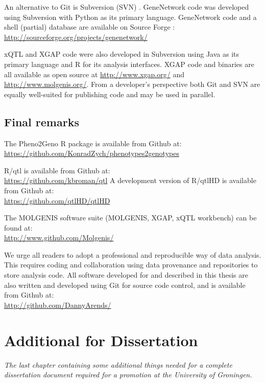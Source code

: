 An alternative to Git is Subversion (SVN) \cite{SVN:2002}. GeneNetwork code was developed 
using Subversion with Python as its primary language. GeneNetwork code and a shell (partial) 
database are available on Source Forge \cite{GeneNetwork:1994, GeneNetwork:2004}:\\
\url{http://sourceforge.org/projects/genenetwork/}

xQTL and XGAP code were also developed in Subversion \cite{SVN:2002} using Java as its primary language and 
R for its analysis interfaces. XGAP code and binaries are all available as open source at
\url{http://www.xgap.org/} and \url{http://www.molgenis.org/}. From a developer's perspective both Git and
SVN are equally well-suited for publishing code and may be used in parallel.

\section{Final remarks}
The Pheno2Geno R package is available from Github at:\\
\url{https://github.com/KonradZych/phenotypes2genotypes}

R/qtl is available from Github at:\\
\url{https://github.com/kbroman/qtl}
A development version of R/qtlHD is available from Github at:\\
\url{https://github.com/qtlHD/qtlHD}

The MOLGENIS software suite (MOLGENIS, XGAP, xQTL workbench) can be found at:\\
\url{http://www.github.com/Molgenis/}

We urge all readers to adopt a professional and reproducible way of data analysis. This requires 
coding and collaboration using data provenance and repositories to store analysis code. All 
software developed for and described in this thesis are also written and developed using Git 
for source code control, and is available from Github at:\\
\url{http://github.com/DannyArends/}

\chapter{Additional for Dissertation}
\thispagestyle{empty}
\emph{The last chapter containing some additional things needed for a complete 
dissertation document required for a promotion at the University of Groningen.}
\null
\vfill
\newpage

